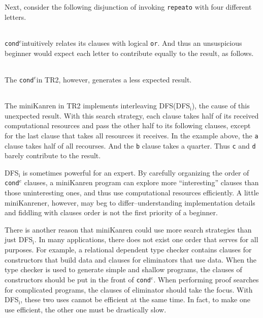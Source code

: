 \documentclass[format=acmlarge, review=true, authordraft=true]{acmart}
\newcommand{\conde}{\texttt{cond$^e$}}
\newcommand{\clisting}[1]{
\begin{center}
  \begin{tabular}{c}
	
    \end{tabular}
\end{center}
}
\newcommand{\DFSi }[0]{DFS$_\textrm{i}$}
\begin{document}
\clisting{Figures/repeato.rkt}

Next, consider the following disjunction of invoking \texttt{repeato} with four 
different letters.

\clisting{Figures/example.rkt}

\conde intuitively relates its clauses with logical \texttt{or}. And thus an 
unsuspicious beginner would expect each letter to contribute equally to the 
result, as follows.

\clisting{Figures/run-repeato-fair.rkt}

The \conde in TR2, however, generates a less expected result.

\clisting{Figures/run-repeato-idfs.rkt}

The miniKanren in TR2 implements interleaving DFS(\DFSi), the cause of this 
unexpected result. With this search strategy, each clause takes half 
of its received computational resources and pass the other half to its 
following clauses, except for the last clause that takes all resources it 
receives. In the example above, the \texttt{a} clause takes half of all 
recourses. And the \texttt{b} clause takes a quarter. Thus \texttt{c} and 
\texttt{d} barely contribute to the result.


\DFSi{} is sometimes powerful for an expert. By carefully organizing the order 
of \conde{} clauses, a miniKanren program can explore more ``interesting'' 
clauses than those uninteresting ones, and thus use computational resources 
efficiently. A little miniKanrener, however, may beg to differ--understanding
implementation details and fiddling with clauses order is not the first
priority of a beginner.

There is another reason that miniKanren could use more search strategies than
just \DFSi. In many applications, there does not exist one order that serves
for all purposes. For example, a relational dependent type checker contains
clauses for constructors that build data and clauses for eliminators that use
data. When the type checker is used to generate simple and shallow programs,
the clauses of constructors should be put in the front of \conde.
When performing proof searches for complicated programs, the clauses of 
eliminator should take the focus. With \DFSi, these two uses cannot be 
efficient at the same time. In fact, to make one use efficient, the other one 
must be drastically slow.
\end{document}
